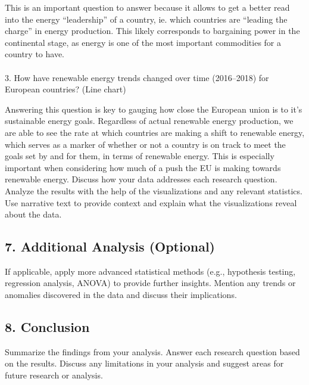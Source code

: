 \documentclass[
  letterpaper,
  DIV=11,
  numbers=noendperiod]{scrartcl}
\makeatletter
\let\oldparagraph\paragraph
\renewcommand{\paragraph}{
    \@ifstar
      \xxxParagraphStar
      \xxxParagraphNoStar
  }
\newcommand{\xxxParagraphStar}[1]{\oldparagraph*{#1}\mbox{}}
\newcommand{\xxxParagraphNoStar}[1]{\oldparagraph{#1}\mbox{}}
\makeatother
\begin{document}
This is an important question to answer because it allows to get a
better read into the energy ``leadership'' of a country, ie. which
countries are ``leading the charge'' in energy production. This likely
corresponds to bargaining power in the continental stage, as energy is
one of the most important commodities for a country to have.

\paragraph{3. How have renewable energy trends changed over time
(2016--2018) for European countries? (Line
chart)}\label{how-have-renewable-energy-trends-changed-over-time-20162018-for-european-countries-line-chart-1}

Answering this question is key to gauging how close the European union
is to it's sustainable energy goals. Regardless of actual renewable
energy production, we are able to see the rate at which countries are
making a shift to renewable energy, which serves as a marker of whether
or not a country is on track to meet the goals set by and for them, in
terms of renewable energy. This is especially important when considering
how much of a push the EU is making towards renewable energy. Discuss
how your data addresses each research question. Analyze the results with
the help of the visualizations and any relevant statistics. Use
narrative text to provide context and explain what the visualizations
reveal about the data.~

\subsection{7. Additional Analysis
(Optional)~}\label{additional-analysis-optional}

If applicable, apply more advanced statistical methods (e.g., hypothesis
testing, regression analysis, ANOVA) to provide further insights.
Mention any trends or anomalies discovered in the data and discuss their
implications.~

\subsection{8. Conclusion~}\label{conclusion}

Summarize the findings from your analysis. Answer each research question
based on the results. Discuss any limitations in your analysis and
suggest areas for future research or analysis.~
\end{document}
